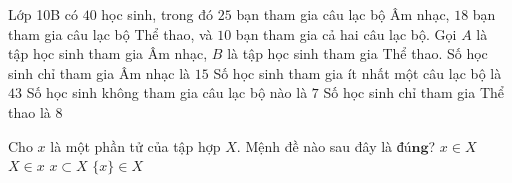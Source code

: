 \begin{ex}%
	Lớp 10B có $40$ học sinh, trong đó $25$ bạn tham gia câu lạc bộ Âm nhạc, $18$ bạn tham gia câu lạc bộ Thể thao, và $10$ bạn tham gia cả hai câu lạc bộ. Gọi $A$ là tập học sinh tham gia Âm nhạc, $B$ là tập học sinh tham gia Thể thao.
	\choiceTF
		{\True Số học sinh chỉ tham gia Âm nhạc là $15$}
		{Số học sinh tham gia ít nhất một câu lạc bộ là $43$}
		{\True Số học sinh không tham gia câu lạc bộ nào là $7$}
		{\True Số học sinh chỉ tham gia Thể thao là $8$}
\end{ex}

\begin{ex}%
	 Cho $x$ là một phần tử của tập hợp $X$. Mệnh đề nào sau đây là $\textbf{đúng}$?
	 \choice
		 {\True $x \in X$}
		{$X  \in x$}
		 {$x \subset X$}
		{$\{x\} \in X$} 
\end{ex}

